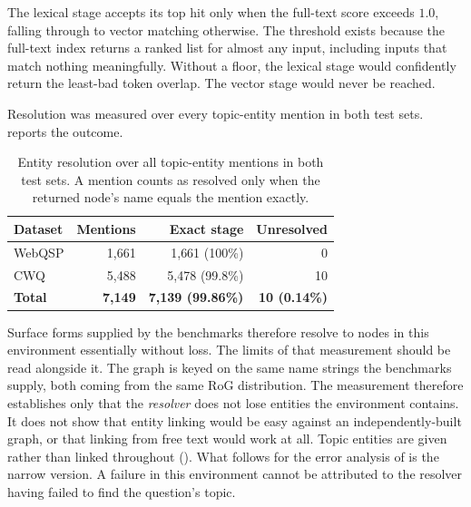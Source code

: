 The lexical stage accepts its top hit only when the full-text score exceeds
$1.0$, falling through to vector matching otherwise. The threshold exists
because the full-text index returns a ranked list for almost any input,
including inputs that match nothing meaningfully. Without a floor, the lexical
stage would confidently return the least-bad token overlap. The vector stage
would never be reached.

Resolution was measured over every topic-entity mention in both test sets.
 reports the outcome.

\begin{table}[!tb]
  \begin{center}
    \caption[Entity resolution over all topic-entity mentions]{Entity resolution
    over all topic-entity mentions in both test sets. A mention counts as
    resolved only when the returned node's name equals the mention exactly.}
    \label{tab:linking}
    \begin{tabular}{|l|r|r|r|}
      \hline
      \textbf{Dataset} & \textbf{Mentions} & \textbf{Exact stage} &
      \textbf{Unresolved} \\
      \hline
      WebQSP & 1{,}661 & 1{,}661 (100\%) & 0 \\
      CWQ    & 5{,}488 & 5{,}478 (99.8\%) & 10 \\
      \hline
      \textbf{Total} & \textbf{7{,}149} & \textbf{7{,}139 (99.86\%)} &
      \textbf{10 (0.14\%)} \\
      \hline
    \end{tabular}
  \end{center}
\end{table}

Surface forms supplied by the benchmarks therefore resolve to nodes in this
environment essentially without loss. The limits of that measurement should be
read alongside it. The graph is keyed on the same name strings the benchmarks
supply, both coming from the same RoG distribution. The measurement therefore
establishes only that the \emph{resolver} does not lose entities the environment
contains. It does not show that entity linking would be easy against an
independently-built graph, or that linking from free text would work at all.
Topic entities are given rather than linked throughout ().
What follows for the error analysis of  is the narrow
version. A failure in this environment cannot be attributed to the resolver
having failed to find the question's topic.

